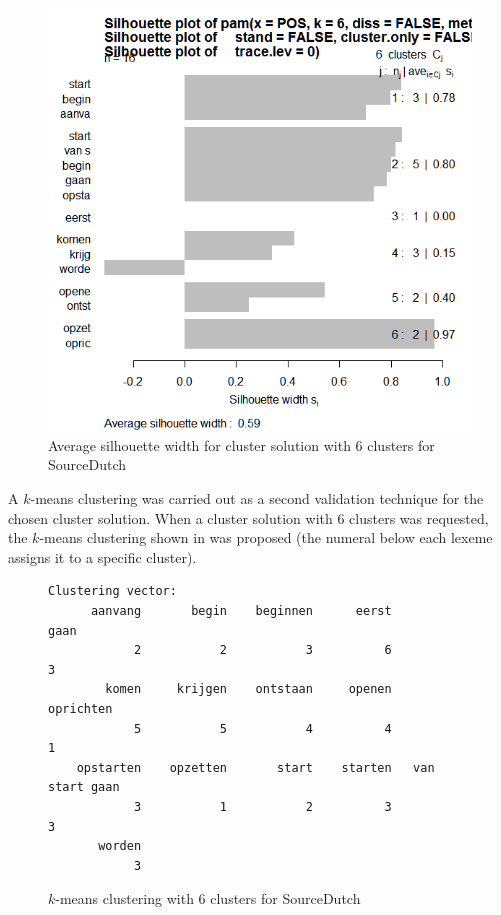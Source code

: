 \begin{figure}
\includegraphics[height=.4\textheight]{figures/Vandevoorde2-img53.png}
\caption{\label{fig:4:53}Average silhouette width for cluster solution with 6 clusters for SourceDutch}
\end{figure}

A $k$-means clustering was carried out as a second validation technique for the chosen cluster solution. When a cluster solution with 6 clusters was requested, the $k$-means clustering shown in  was proposed (the numeral below each lexeme assigns it to a specific cluster).
  
\begin{figure}
\centering%
\begin{lstlisting}
Clustering vector:
      aanvang       begin    beginnen      eerst             gaan 
            2           2           3          6                3         
        komen     krijgen    ontstaan     openen        oprichten         
            5           5           4          4                1         
    opstarten    opzetten       start    starten   van start gaan         
            3           1           2          3                3         
       worden                                            
            3                                      
\end{lstlisting}     
\caption{\label{fig:4:54}$k$-means clustering with 6 clusters for SourceDutch}
\end{figure}

